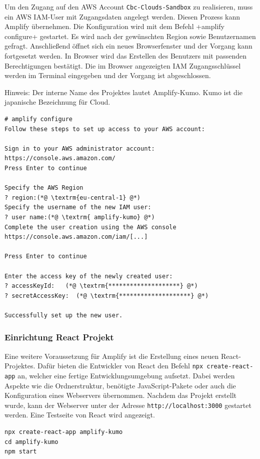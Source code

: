 Um den Zugang auf den AWS Account \verb+Cbc-Clouds-Sandbox+ zu realisieren, muss ein AWS IAM-User mit Zugangsdaten angelegt werden.
Diesen Prozess kann Amplify übernehmen.
Die Konfiguration wird mit dem Befehl \spverb+amplify configure+ gestartet.
Es wird nach der gewünschten Region sowie Benutzernamen gefragt.
Anschließend öffnet sich ein neues Browserfenster und der Vorgang kann fortgesetzt werden.
In Browser wird das Erstellen des Benutzers mit passenden Berechtigungen bestätigt.
Die im Browser angezeigten IAM Zugangsschlüssel werden im Terminal eingegeben und der Vorgang ist abgeschlossen.\cite[]{ImpVoraus}

Hinweis: Der interne Name des Projektes lautet Amplify-Kumo.
Kumo ist die japanische Bezeichnung für \glqq Cloud\grqq.
\\

\begin{lstlisting}[basicstyle=\ttfamily\small, breaklines=true , frame = single, backgroundcolor=\color{flashwhite} ]
# amplify configure
Follow these steps to set up access to your AWS account:

Sign in to your AWS administrator account:
https://console.aws.amazon.com/
Press Enter to continue

Specify the AWS Region
? region:(*@ \textrm{eu-central-1} @*)
Specify the username of the new IAM user:
? user name:(*@ \textrm{ amplify-kumo} @*)
Complete the user creation using the AWS console
https://console.aws.amazon.com/iam/[...]

Press Enter to continue

Enter the access key of the newly created user:
? accessKeyId:   (*@ \textrm{********************} @*)
? secretAccessKey:  (*@ \textrm{********************} @*)

Successfully set up the new user.
\end{lstlisting}

\clearpage
\subsubsection{Einrichtung React Projekt}

Eine weitere Voraussetzung für Amplify ist die Erstellung eines neuen React-Projektes.
Dafür bieten die Entwickler von React den Befehl \verb+npx create-react-app+ an, welcher eine fertige Entwicklungsumgebung aufsetzt.
Dabei werden Aspekte wie die Ordnerstruktur, benötigte JavaScript-Pakete oder auch die Konfiguration eines Webservers übernommen.\cite[]{ReactNew}
Nachdem das Projekt erstellt wurde, kann der Webserver unter der Adresse \verb+http://localhost:3000+ gestartet werden.
Eine Testseite von React wird angezeigt.
\\
\begin{lstlisting}[basicstyle=\ttfamily\small, breaklines=true , frame = single, backgroundcolor=\color{flashwhite} ]
npx create-react-app amplify-kumo
cd amplify-kumo
npm start
\end{lstlisting}


